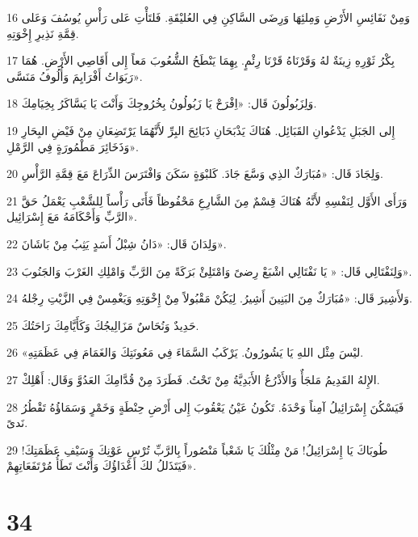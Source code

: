 \par 16 وَمِنْ نَفَائِسِ الأَرْضِ وَمِلئِهَا وَرِضَى السَّاكِنِ فِي العُليْقَةِ. فَلتَأْتِ عَلى رَأْسِ يُوسُفَ وَعَلى قِمَّةِ نَذِيرِ إِخْوَتِهِ.
\par 17 بِكْرُ ثَوْرِهِ زِينَةٌ لهُ وَقَرْنَاهُ قَرْنَا رِئْمٍ. بِهِمَا يَنْطَحُ الشُّعُوبَ مَعاً إِلى أَقَاصِي الأَرْضِ. هُمَا رَبَوَاتُ أَفْرَايِمَ وَأُلُوفُ مَنَسَّى».
\par 18 وَلِزَبُولُونَ قَال: «اِفْرَحْ يَا زَبُولُونُ بِخُرُوجِكَ وَأَنْتَ يَا يَسَّاكَرُ بِخِيَامِكَ.
\par 19 إِلى الجَبَلِ يَدْعُوانِ القَبَائِل. هُنَاكَ يَذْبَحَانِ ذَبَائِحَ البِرِّ لأَنَّهُمَا يَرْتَضِعَانِ مِنْ فَيْضِ البِحَارِ وَذَخَائِرَ مَطْمُورَةٍ فِي الرَّمْلِ».
\par 20 وَلِجَادَ قَال: «مُبَارَكٌ الذِي وَسَّعَ جَادَ. كَلبْوَةٍ سَكَنَ وَافْتَرَسَ الذِّرَاعَ مَعَ قِمَّةِ الرَّأْسِ.
\par 21 وَرَأَى الأَوَّل لِنَفْسِهِ لأَنَّهُ هُنَاكَ قِسْمٌ مِنَ الشَّارِعِ مَحْفُوظاً فَأَتَى رَأْساً لِلشَّعْبِ يَعْمَلُ حَقَّ الرَّبِّ وَأَحْكَامَهُ مَعَ إِسْرَائِيل».
\par 22 وَلِدَانَ قَال: «دَانُ شِبْلُ أَسَدٍ يَثِبُ مِنْ بَاشَانَ».
\par 23 وَلِنَفْتَالِي قَال: « يَا نَفْتَالِي اشْبَعْ رِضىً وَامْتَلِئْ بَرَكَةً مِنَ الرَّبِّ وَامْلِكِ الغَرْبَ وَالجَنُوبَ».
\par 24 وَلأَشِيرَ قَال: «مُبَارَكٌ مِنَ البَنِينَ أَشِيرُ. لِيَكُنْ مَقْبُولاً مِنْ إِخْوَتِهِ وَيَغْمِسْ فِي الزَّيْتِ رِجْلهُ.
\par 25 حَدِيدٌ وَنُحَاسٌ مَزَالِيجُكَ وَكَأَيَّامِكَ رَاحَتُكَ.
\par 26 «ليْسَ مِثْل اللهِ يَا يَشُورُونُ. يَرْكَبُ السَّمَاءَ فِي مَعُونَتِكَ وَالغَمَامَ فِي عَظَمَتِهِ.
\par 27 الإِلهُ القَدِيمُ مَلجَأٌ وَالأَذْرُعُ الأَبَدِيَّةُ مِنْ تَحْتُ. فَطَرَدَ مِنْ قُدَّامِكَ العَدُوَّ وَقَال: أَهْلِكْ.
\par 28 فَيَسْكُنَ إِسْرَائِيلُ آمِناً وَحْدَهُ. تَكُونُ عَيْنُ يَعْقُوبَ إِلى أَرْضِ حِنْطَةٍ وَخَمْرٍ وَسَمَاؤُهُ تَقْطُرُ نَدىً.
\par 29 طُوبَاكَ يَا إِسْرَائِيلُ! مَنْ مِثْلُكَ يَا شَعْباً مَنْصُوراً بِالرَّبِّ تُرْسِ عَوْنِكَ وَسَيْفِ عَظَمَتِكَ! فَيَتَذَللُ لكَ أَعْدَاؤُكَ وَأَنْتَ تَطَأُ مُرْتَفَعَاتِهِمْ».

\chapter{34}

